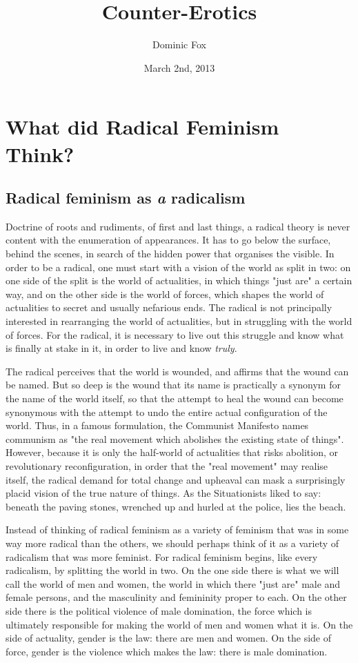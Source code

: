 \documentclass[ebook]{memoir}
\title{Counter-Erotics}
\author{Dominic Fox}
\date{March 2nd, 2013}
\begin{document}
\maketitle

\chapter{What did Radical Feminism Think?}

\section{Radical feminism as \emph{a} radicalism}

Doctrine of roots and rudiments, of first and last things, a radical theory is never content with the enumeration of appearances. It has to go below the surface, behind the scenes, in search of the hidden power that organises the visible. In order to be a radical, one must start with a vision of the world as split in two: on one side of the split is the world of actualities, in which things "just are" a certain way, and on the other side is the world of forces, which shapes the world of actualities to secret and usually nefarious ends. The radical is not principally interested in rearranging the world of actualities, but in struggling with the world of forces. For the radical, it is necessary to live out this struggle and know what is finally at stake in it, in order to live and know \emph{truly}.

The radical perceives that the world is wounded, and affirms that the wound can be named. But so deep is the wound that its name is practically a synonym for the name of the world itself, so that the attempt to heal the wound can become synonymous with the attempt to undo the entire actual configuration of the world. Thus, in a famous formulation, the Communist Manifesto names communism as "the real movement which abolishes the existing state of things". However, because it is only the half-world of actualities that risks abolition, or revolutionary reconfiguration, in order that the "real movement" may realise itself, the radical demand for total change and upheaval can mask a surprisingly placid vision of the true nature of things. As the Situationists liked to say: beneath the paving stones, wrenched up and hurled at the police, lies the beach.

Instead of thinking of radical feminism as a variety of feminism that was in some way more radical than the others, we should perhaps think of it as a variety of radicalism that was more feminist. For radical feminism begins, like every radicalism, by splitting the world in two. On the one side there is what we will call the world of men and women, the world in which there "just are" male and female persons, and the masculinity and femininity proper to each. On the other side there is the political violence of male domination, the force which is ultimately responsible for making the world of men and women what it is. On the side of actuality, gender is the law: there are men and women. On the side of force, gender is the violence which makes the law: there is male domination.
\end{document}
